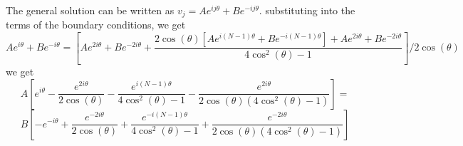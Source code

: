 \documentclass[12pt]{report}
\begin{document}
The general solution can be written as $v_j=Ae^{ij\theta}+Be^{-ij\theta}$. substituting into the terms of the boundary conditions, we get 
\begin{equation*}
Ae^{i\theta}+Be^{-i\theta}=\left[Ae^{2i\theta}+Be^{-2i\theta}+\frac{2\cos(\theta)[Ae^{i(N-1)\theta}+Be^{-i(N-1)\theta}]+Ae^{2i\theta}+Be^{-2i\theta}}{4\cos^2(\theta)-1}\right]/2\cos(\theta)
\end{equation*}
we get 
\begin{equation*}
A\left[e^{i\theta}-\frac{e^{2i\theta}}{2\cos(\theta)}-\frac{e^{i(N-1)\theta}}{4\cos^2(\theta)-1}-\frac{e^{2i\theta}}{2\cos(\theta)(4\cos^2(\theta)-1)}\right]=
\end{equation*}
\begin{equation*}
B\left[-e^{-i\theta}+\frac{e^{-2i\theta}}{2\cos(\theta)} +\frac{e^{-i(N-1)\theta}}{4\cos^2(\theta)-1}+\frac{e^{-2i\theta}}{2\cos(\theta)(4\cos^2(\theta)-1)}\right]
\end{equation*}
  

\end{document}
